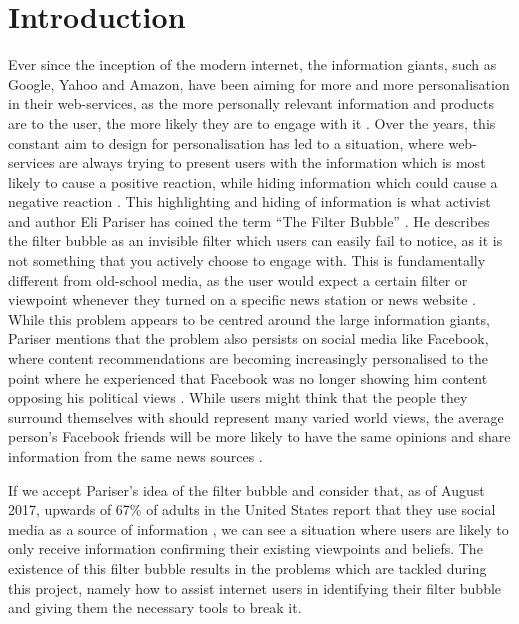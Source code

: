 \chapter{Introduction}\label{ch:intro} 

Ever since the inception of the modern internet, the information giants, such as
Google, Yahoo and Amazon, have been aiming for more and more personalisation in
their web-services, as the more personally relevant information and products are
to the user, the more likely they are to engage with it
\citep[p.8]{pariser2011filter}. Over the years, this constant aim to design for
personalisation has led to a situation, where web-services are always trying to
present users with the information which is most likely to cause a positive
reaction, while hiding information which could cause a negative reaction
\citep{filterBubbleDef, Personality}. This highlighting and hiding of
information is what activist and author Eli Pariser has coined the term ``The
Filter Bubble'' \citep[p.9]{pariser2011filter}. He describes the filter bubble
as an invisible filter which users can easily fail to notice, as it is not
something that you actively choose to engage with. This is fundamentally
different from old-school media, as the user would expect a certain filter or
viewpoint whenever they turned on a specific news station or news website
\citep[p.10]{pariser2011filter}. While this problem appears to be centred
around the large information giants, Pariser mentions that the problem also
persists on social media like Facebook, where content recommendations are
becoming increasingly personalised to the point where he experienced that
Facebook was no longer showing him content opposing his political views
\citep{pariserTedSummary}. While users might think that the people they surround
themselves with should represent many varied world views, the average person's
Facebook friends will be more likely to have the same opinions and share
information from the same news sources \citep[p.66]{pariser2011filter}.\nl

If we accept Pariser's idea of the filter bubble and consider that, as of August
2017, upwards of 67\% of adults in the United States report that they use social
media as a source of information \citep{journalism2017}, we can see a
situation where users are likely to only receive information confirming their
existing viewpoints and beliefs. The existence of this filter
bubble results in the problems which are tackled during this project, namely
how to assist internet users in identifying their filter bubble and giving them
the necessary tools to break it.

